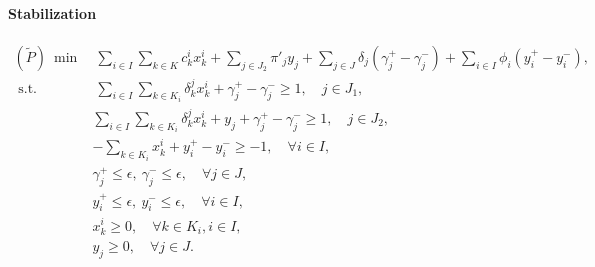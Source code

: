 \documentclass[12pt]{article}
\begin{document}
	\paragraph{Stabilization}
\begin{align*}
	(\tilde{P})~ \min& ~ \sum _ { i \in I } \sum _ { k \in K } c _ { k } ^ { i } x _ { k } ^ { i } + \sum_{ j \in J_2 } \pi'_j y_j + \sum_{ j \in J }\delta_j (\gamma_j^+ - \gamma_j^-) + \sum_{i \in I}\phi_i(y_i^+ - y_i^-),\\
\text { s.t. }&  ~ \sum _ { i \in I } \sum _ { k \in K _ { i } } \delta _ { k } ^ { j } x _ { k } ^ { i } + \gamma_j^+ - \gamma_j^- \geq 1 , \quad j \in J_1, \\
& \sum _ { i \in I } \sum _ { k \in K _ { i } } \delta _ { k } ^ { j } x _ { k } ^ { i } + y_j + \gamma_j^+ - \gamma_j^-\geq 1 , \quad j \in J_2, \\
&- \sum _ { k \in K _ { i } } x _ { k } ^ { i } +y_i^+ - y_i^-\geq - 1 , \quad \forall i \in I ,\\
	& \gamma_j^+ \leq \epsilon , ~ \gamma_j^- \leq \epsilon,\quad \forall j \in J,  \\
& y_i^+ \leq \epsilon, ~ y_i^-  \leq \epsilon, \quad \forall i \in I, \\
&x _ { k } ^ { i } \geq 0 , \quad \forall k \in K _ { i } , i \in I,\\
&y_j \geq 0, \quad \forall j \in J.
\end{align*}	
	
	
\end{document}
